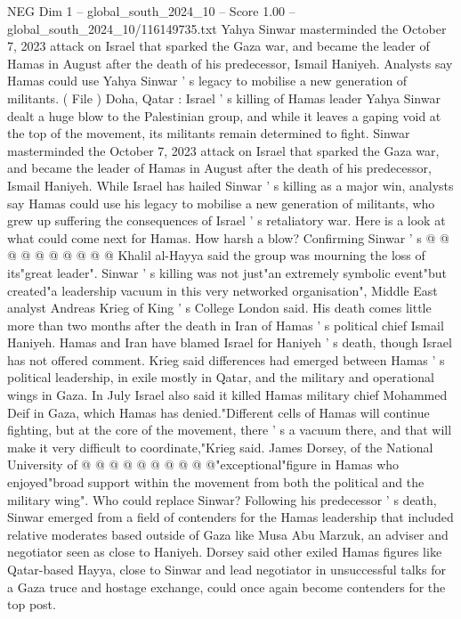 \begin{textsample}{NEG Dim 1 – global\_south\_2024\_10 – Score 1.00 – global\_south\_2024\_10/116149735.txt}  \label{ex:f1_neg_286}
Yahya Sinwar masterminded the October 7, 2023 attack on Israel that sparked the Gaza war, and became the leader of Hamas in August after the death of his predecessor, Ismail Haniyeh.
Analysts say Hamas could use Yahya Sinwar ' s legacy to mobilise a new generation of militants. ( File ) Doha, Qatar : Israel ' s killing of Hamas leader Yahya Sinwar dealt a huge blow to the Palestinian group, and while it leaves a gaping void at the top of the movement, its militants remain determined to fight.
Sinwar masterminded the October 7, 2023 attack on Israel that sparked the Gaza war, and became the leader of Hamas in August after the death of his predecessor, Ismail Haniyeh.
While Israel has hailed Sinwar ' s killing as a major win, analysts say Hamas could use his legacy to mobilise a new generation of militants, who grew up suffering the consequences of Israel ' s retaliatory war.
Here is a look at what could come next for Hamas.
How harsh a blow?
Confirming Sinwar ' s @ @ @ @ @ @ @ @ @ @ Khalil al-Hayya said the group was mourning the loss of its"great leader".
Sinwar ' s killing was not just"an extremely symbolic event"but created"a leadership vacuum in this very networked organisation", Middle East analyst Andreas Krieg of King ' s College London said.
His death comes little more than two months after the death in Iran of Hamas ' s political chief Ismail Haniyeh.
Hamas and Iran have blamed Israel for Haniyeh ' s death, though Israel has not offered comment.
Krieg said differences had emerged between Hamas ' s political leadership, in exile mostly in Qatar, and the military and operational wings in Gaza.
In July Israel also said it killed Hamas military chief Mohammed Deif in Gaza, which Hamas has denied."Different cells of Hamas will continue fighting, but at the core of the movement, there ' s a vacuum there, and that will make it very difficult to coordinate,"Krieg said.
James Dorsey, of the National University of @ @ @ @ @ @ @ @ @ @"exceptional"figure in Hamas who enjoyed"broad support within the movement from both the political and the military wing".
Who could replace Sinwar?
Following his predecessor ' s death, Sinwar emerged from a field of contenders for the Hamas leadership that included relative moderates based outside of Gaza like Musa Abu Marzuk, an adviser and negotiator seen as close to Haniyeh.
Dorsey said other exiled Hamas figures like Qatar-based Hayya, close to Sinwar and lead negotiator in unsuccessful talks for a Gaza truce and hostage exchange, could once again become contenders for the top post.

\end{textsample}

